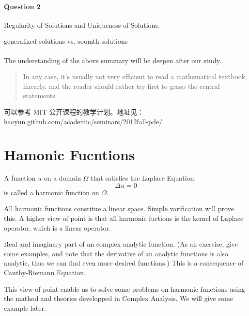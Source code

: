 \documentclass{simplenotes}
\begin{document}
\paragraph{Question 2}
Regularity of Solutions and Uniqueness of Solutions.

generalized solutions  vs. soomth solutions

\paragraph{}
The understanding of the above summary will be deepen after our study. 


\begin{quotation}
In any case, it's usually not very efficient to read a mathematical textbook linearly, and the reader should rather try first to grasp the central statements.
\end{quotation}

可以参考 MIT 公开课程的教学计划。地址见：\url{haoyun.github.com/academic/seminars/2012fall-pde/}

\section{Hamonic Fucntions}

\begin{definition}
A function  $u$ on a domain $\Omega$ that satisfies the Laplace Equation:
\[\Delta u = 0\]
is called a harmonic function on $\Omega$.
\end{definition}

\begin{remark}
All harmonic functions constitue a linear space. Simple varification will prove this. A higher view of point is that all harmonic fuctions is the kernel of Laplace operator, which is a linear operator.
\end{remark}

\begin{example}
Real and imaginary part of an complex analytic function.
(As an exercise, give some examples, and note that the derivative of an analytic functions is also analytic, thus we can find even more desired functions.) This is a consequence of Cauthy-Riemann Equation.
\end{example}

\begin{remark}
This view of point enable us to solve some problems on harmonic functions using the mathod and theories developped in Complex Analysis. We will give some example later.
\end{remark}
\end{document}
